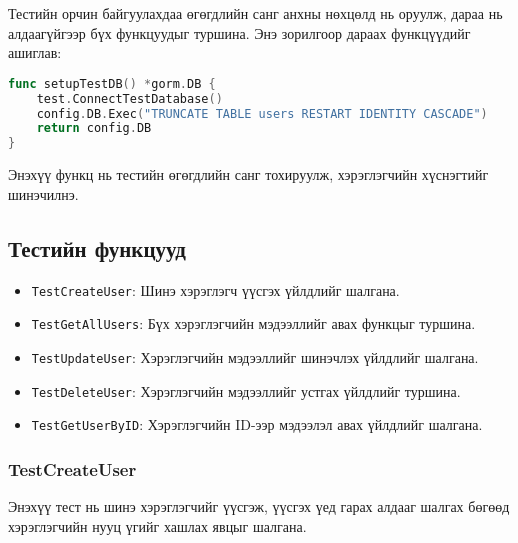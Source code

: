 Тестийн орчин байгуулахдаа өгөгдлийн санг анхны нөхцөлд нь оруулж, дараа нь алдаагүйгээр бүх функцуудыг туршина. Энэ зорилгоор дараах функцүүдийг ашиглав:

\begin{lstlisting}[language=Go, caption=Test Database Setup, frame=single]
func setupTestDB() *gorm.DB {
    test.ConnectTestDatabase()
    config.DB.Exec("TRUNCATE TABLE users RESTART IDENTITY CASCADE") 
    return config.DB
}
\end{lstlisting}

Энэхүү функц нь тестийн өгөгдлийн санг тохируулж, хэрэглэгчийн хүснэгтийг шинэчилнэ.

\subsection{Тестийн функцууд}

\begin{itemize}
    \item \texttt{TestCreateUser}: Шинэ хэрэглэгч үүсгэх үйлдлийг шалгана.
    \item \texttt{TestGetAllUsers}: Бүх хэрэглэгчийн мэдээллийг авах функцыг туршина.
    \item \texttt{TestUpdateUser}: Хэрэглэгчийн мэдээллийг шинэчлэх үйлдлийг шалгана.
    \item \texttt{TestDeleteUser}: Хэрэглэгчийн мэдээллийг устгах үйлдлийг туршина.
    \item \texttt{TestGetUserByID}: Хэрэглэгчийн ID-ээр мэдээлэл авах үйлдлийг шалгана.
\end{itemize}

\subsubsection{TestCreateUser}

Энэхүү тест нь шинэ хэрэглэгчийг үүсгэж, үүсгэх үед гарах алдааг шалгах бөгөөд хэрэглэгчийн нууц үгийг хашлах явцыг шалгана.

